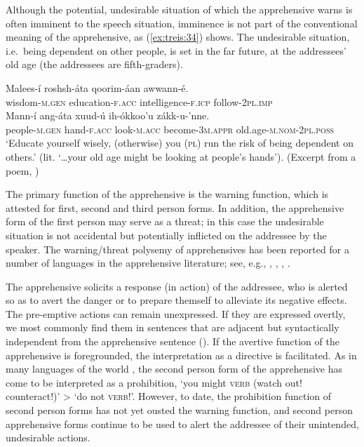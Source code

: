 \documentclass[output=paper,colorlinks,citecolor=brown,]{langscibook}
\begin{document}
Although the potential, undesirable situation of which the apprehensive warns is often imminent to the speech situation, imminence is not part of the conventional meaning of the apprehensive, as (\ref{ex:treis:34}) shows. The undesirable situation,  i.e.~being dependent on other people, is set in the far future, at the addressees' old age (the addressees are fifth-graders).

\ea\label{ex:treis:34} 
\gll Malees-í 			roshsh-áta 			qoorim-áan 		awwann-é. \\ 
wisdom-\textsc{m.gen} education-\textsc{f.acc}	intelligence-\textsc{f.icp}	follow-\textsc{2pl.imp}\\ \newline
\gll Mann-í 			ang-áta 		xuud-ú 		ih-ókkoo'u 			zákk-u-'nne. \\
people-\textsc{m.gen}	hand-\textsc{f.acc}	look-\textsc{m.acc}	become-\textsc{3m.appr}	old.age-\textsc{m.nom-2pl.poss}\\
\glt `Educate yourself wisely, (otherwise) you (\textsc{pl}) run the risk of being dependent on others.' (lit. `\ldots your old age might be looking at people's hands'). (Excerpt from a poem, \citealt[5.90]{KEB1989})
\z 

The primary function of the  apprehensive is the warning function, which is attested for first, second and third person forms. In addition, the apprehensive form of the first person may serve as a threat; in this case the undesirable situation is not accidental but potentially inflicted on the addressee by the speaker. The warning\slash threat polysemy of apprehensives has been reported for a number of languages in the apprehensive literature; see, e.g., \citet{lichtenberk1995}, \citet{FallerSchultzeBerndt2018u}, \citet{Vuillermet2018u, chapters/vuillermet},  \citet{chapters/introduction}.

The apprehensive solicits a response (in action) of the addressee, who is alerted so as to avert the danger or to prepare themself to alleviate its negative effects. The pre-emptive actions can remain unexpressed. If they are expressed overtly, we most commonly find them in sentences that are adjacent but syntactically independent from the apprehensive sentence (). If the avertive function of the apprehensive is foregrounded, the interpretation as a directive is facilitated. As in many languages of the world \citep{Dobrushina2006, pakendorfschalley2007}, the second person form of the  apprehensive has come to be interpreted as a prohibition, `you might \textsc{verb} (watch out! counteract!)' > `do not \textsc{verb}!'. However, to date, the prohibition function of second person forms has not yet ousted the warning function, and second person apprehensive forms continue to be used to alert the addressee of their unintended, undesirable actions.
\end{document}
